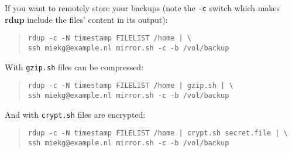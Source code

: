 \documentclass[a4, 10pt]{article}
\newcommand{\rdup}{\textbf{rdup}}
\newcommand{\cmd}[1]{\texttt{#1}}
\begin{document}
\noindent If you want to remotely store your backups (note the \cmd{-c} switch which makes
\rdup{} include the files' content in its output):
\begin{quote}
\begin{verbatim}
rdup -c -N timestamp FILELIST /home | \
ssh miekg@example.nl mirror.sh -c -b /vol/backup
\end{verbatim}
\end{quote}

\noindent With \cmd{gzip.sh} files can be compressed:
\begin{quote}
\begin{verbatim}
rdup -c -N timestamp FILELIST /home | gzip.sh | \
ssh miekg@example.nl mirror.sh -c -b /vol/backup
\end{verbatim}
\end{quote}

\noindent And with \cmd{crypt.sh} files are encrypted:
\begin{quote}
\begin{verbatim}
rdup -c -N timestamp FILELIST /home | crypt.sh secret.file | \
ssh miekg@example.nl mirror.sh -c -b /vol/backup
\end{verbatim}
\end{quote}
\end{document}
